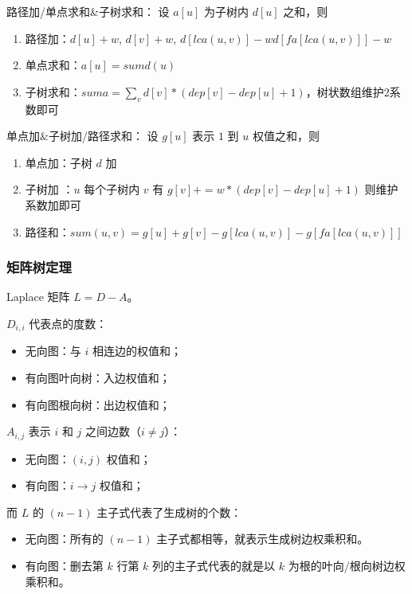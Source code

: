 \documentclass[twoside,twocolumn]{article}
\begin{document}
路径加/单点求和\&子树求和： 设 $a[u]$ 为子树内 $d[u]$ 之和，则

\begin{enumerate}
    \item 路径加：$d[u]+w$, $d[v]+w$, $d[lca(u,v)]-w d[fa[lca(u,v)]]-w$
    \item 单点求和：$a[u]=sumd(u)$
    \item 子树求和：$suma=\sum_v d[v]*(dep[v]-dep[u]+1)$，树状数组维护2系数即可
\end{enumerate}


单点加\&子树加/路径求和： 设 $g[u]$ 表示 $1$ 到 $u$ 权值之和，则

\begin{enumerate}
    \item 单点加：子树 $d$ 加
    \item 子树加 ：$u$ 每个子树内 $v$ 有 $g[v] += w*(dep[v]-dep[u]+1)$ 则维护系数加即可
    \item 路径和：$sum(u,v)=g[u]+g[v]-g[lca(u,v)]-g[fa[lca(u,v)]]$
\end{enumerate}

\subsubsection{矩阵树定理} %

Laplace 矩阵 $L=D-A$。


\begin{minipage}[t]{0.45\textwidth}
    $D_{i,i}$ 代表点的度数：
    \begin{itemize}[noitemsep, topsep=-5pt]
        \item 无向图：与 $i$ 相连边的权值和；
        \item 有向图叶向树：入边权值和；
        \item 有向图根向树：出边权值和；
    \end{itemize}
\end{minipage}
\hfill
\begin{minipage}[t]{0.45\textwidth}
    $A_{i,j}$ 表示 $i$ 和 $j$ 之间边数（$i\ne j$）：
    \begin{itemize}[noitemsep, topsep=-5pt]
        \item 无向图：$(i,j)$ 权值和；
        \item 有向图：$i\to j$ 权值和；
    \end{itemize}
\end{minipage}
\bigskip

而 $L$ 的 $(n-1)$ 主子式代表了生成树的个数：
\begin{itemize}[noitemsep, topsep=-5pt]
    \item 无向图：所有的 $(n-1)$ 主子式都相等，就表示生成树边权乘积和。
    \item 有向图：删去第 $k$ 行第 $k$ 列的主子式代表的就是以 $k$ 为根的叶向/根向树边权乘积和。
\end{itemize}
\end{document}
